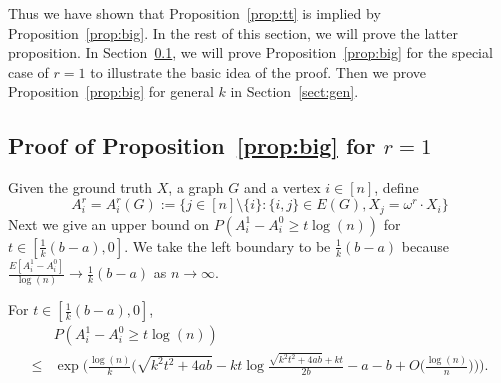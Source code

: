 \documentclass{article}
\begin{document}
Thus we have shown that Proposition~\ref{prop:tt} is implied by Proposition~\ref{prop:big}. In the rest of this section, we will prove the latter proposition. In Section~\ref{sect:k=1}, we will prove Proposition~\ref{prop:big} for the special case of $r=1$ to illustrate the basic idea of the proof. Then we prove Proposition~\ref{prop:big} for general $k$ in Section~\ref{sect:gen}.


\subsection{Proof of Proposition~\ref{prop:big} for $r=1$} \label{sect:k=1}

Given the ground truth $X$, a graph $G$ and a vertex $i\in[n]$, define
\begin{equation} \label{eq:defAB}
A^r_i=A^r_i(G):=\{j\in[n]\setminus\{i\}:\{i,j\}\in E(G), X_j= \omega^r \cdot X_i\} 
\end{equation}
Next we give an upper bound on $P(A^1_i-A^0_i\ge t\log(n))$ for $t\in [\frac{1}{k}(b-a), 0]$. We take the left boundary to be $\frac{1}{k}(b-a)$ because $\frac{E[A^1_i-A^0_i]}{\log(n)}\to\frac{1}{k}(b-a)$ as $n\to\infty$.
\begin{proposition}  \label{prop:cher}
For $t\in [\frac{1}{k}(b-a), 0]$,
\begin{equation} \label{eq:upba}
\begin{aligned}
& P(A^1_i-A^0_i\ge t\log(n))  \\
\le &  \exp\Big(\frac{\log(n)}{k}
\Big(\sqrt{k^2t^2+4ab} -kt\log\frac{\sqrt{k^2t^2+4ab}+kt}{2b} -a-b + O\big(\frac{\log(n)}{n}\big) \Big)\Big) .
\end{aligned}
\end{equation}
\end{proposition}
\end{document}
